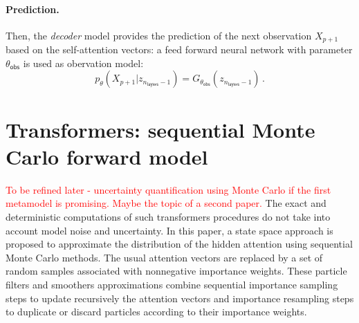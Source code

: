 \documentclass[nolayout]{article}
\newcommand{\eqsp}{\,}
\newcommand{\rset}{\ensuremath{\mathbb{R}}}
\def\nlayer{n_{\mathsf{layers}}}
\newcommand{\paramobs}{\theta_{\mathsf{obs}}}
\begin{document}
\paragraph{Prediction.}
Then, the {\em decoder} model provides the prediction of the next observation $X_{p+1}$ based on the self-attention vectors:  a feed forward neural network with parameter $\paramobs$ is used as obervation model:
$$
p_{\theta}(X_{p+1}|z_{\nlayer-1}) = G_{\paramobs}(z_{\nlayer-1})\eqsp.
$$



\section{Transformers:  sequential Monte Carlo forward model}
\label{sec:smctransformers:forward}
\textcolor{red}{To be refined later - uncertainty quantification using Monte Carlo if the first metamodel is promising. Maybe the topic of a second paper.}
The exact and deterministic computations of such transformers  procedures do not take into account model noise and uncertainty. In this paper, a state space approach is proposed to approximate the distribution of the hidden attention using sequential Monte Carlo methods. The usual attention vectors are replaced by a set of random samples associated with nonnegative importance weights. These particle filters and smoothers approximations combine sequential importance sampling steps to update recursively the attention vectors and importance resampling steps to duplicate or discard particles according to their importance weights.
\end{document}
